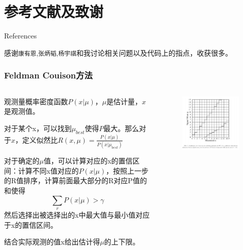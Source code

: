 \documentclass{beamer}
\begin{document}
\section{参考文献及致谢}
\begin{frame}[allowframebreaks]{References}
	
    
    


    感谢\texttt{康有恩},\texttt{张炳韬},\texttt{杨宇祺}和我讨论相关问题以及代码上的指点，收获很多。
\end{frame}
\begin{frame}
    \frametitle{Feldman Couison方法}
    \begin{columns}
        \begin{column}{0.5\textwidth}
            观测量概率密度函数$P(x|\mu)$，$\mu$是估计量，$x$是观测值。

            对于某个x，可以找到$\mu_{best}$使得$P$最大。那么对于$x$，定义似然比$R(x,\mu)=\frac{P(x|\mu)}{P(x|\mu_{best})}$

            对于确定的$\mu$值，可以计算对应的x的置信区间：计算不同x值对应的$P(x|\mu)$，按照上一步的R值排序，计算前面最大部分的R对应P值的和使得
            \[\sum_r{P(x|\mu)}>\gamma\]
            然后选择出被选择出的x中最大值与最小值对应于x的置信区间。

            结合实际观测的值x给出估计得$\mu$的上下限。
        \end{column}
        \begin{column}{0.5\textwidth}
            \begin{figure}[h]
                \includegraphics[width=\columnwidth]{figure/fc.png}
            \end{figure}
        \end{column}
    \end{columns}
\end{frame}
\end{document}
